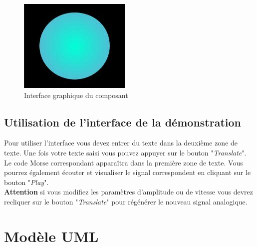 \documentclass[a4paper,11pt]{article}
\begin{document}
    \begin{figure}[H]
        \begin{center}
            \includegraphics[scale=1]{comdescpicture.jpg}
            \caption{Interface graphique du composant}
            \label{Interface graphique du composant}
        \end{center}
    \end{figure}
    \subsection{Utilisation de l'interface de la démonstration}
    Pour utiliser l'interface vous devez entrer du texte dans la deuxième zone de texte. Une fois votre texte saisi vous pouvez appuyer sur le bouton "\textit{Translate}". Le code Morse correspondant apparaîtra dans la première zone de texte. Vous pourrez également écouter et visualiser le signal correspondent en cliquant sur le bouton "\textit{Play}".\\
    \textbf{Attention} si vous modifiez les paramètres d'amplitude ou de vitesse vous devrez recliquer sur le bouton "\textit{Translate}" pour régénérer le nouveau signal analogique.


    \section{Modèle UML}
\end{document}
